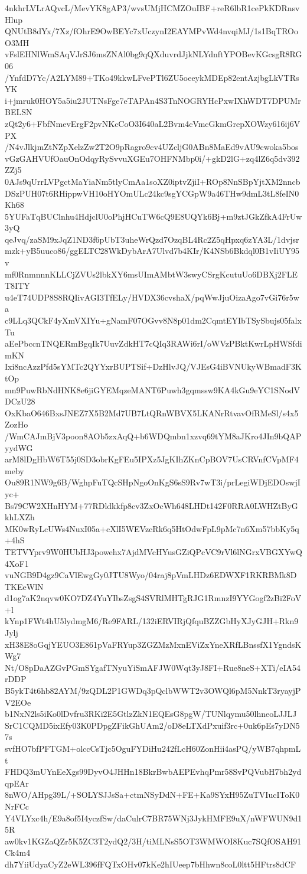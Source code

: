 4nkhrLVLrAQvcL/MevYK8gAP3/wvsUMjHCMZOuIBF+reR6lbR1cePkKDRnsvHlup
QNUtB8dYx/7Xz/fOhrE9OwBEYc7xUczynI2EAYMPvWd4nvqiMJ/1s1BqTROoO3MH
vFslEHNlWmSAqVJrSJ6msZNAl0bg9qQXduvrdJjkNLYdnftYPOBevKGcsgR8RG06
/YnfdD7Yc/A2LYM89+TKo49kkwLFvePTl6ZU5oeeykMDEp82entAzjbgLkVTRsYK
i+jmruk0HOY5a5iu2JUTNsFge7eTAPAn4S3TnNOGRYHcPxwIXhWDT7DPUMrBELSN
zQt2y6+FbfNmevErgF2pvNKcCoO3I640aL2Bvm4cVmcGkmGrepXOWzy616ij6VPX
/N4vJlkjmZtNZpXelzZw2T2O9pRagro9cv4UZcljG0ABn8MaEd9vAU9cwoka5bos
vGzGAHVUfOauOnOdqyRySvvuXGEu7OHFNMbp0i/+gkD2lG+zq4lZ6q5dv392ZZj5
0AJs9qUrrLVPgctMaYiaNm5tlyCmAa1soXZ0iptvZjiI+ROp8NnSBpYjtXM2nncb
DSzPUH07t6RHippwVH10oHYOmULc24kc9sgYCGpW9a46THw9dmL3tL8feIN0Kh68
5YUFaTqBUClnhu4HdjclU0oPhjHCuTW6cQ9E8UQYk6Bj+m9ztJGkZfkA4FrUw3yQ
qeJvq/zaSM9xJqZ1ND3f6pUbT3uheWrQzd7OzqBL4Rc2Z5qHpxq6zYA3L/1dvjsr
mzk+yB5uuco86/ggELTC28WkDybArA7Ulvd7b4KIr/K4NSb6Bkdql0B1vIiUY95v
mf0RnmnnnKLLCjZVUs2lbkXY6msUImAMbtW3swyCSrgKcutuUo6DBXj2FLET8ITY
u4eT74UDP8S8RQIivAGI3TfELy/HVDX36cvshaX/pqWwJjuOizaAgo7vGi76r5wa
c9LLq3QCkF4yXmVXIYu+gNamF07OGvv8N8p01dm2CqmtEYIbTSySbujs05falxTu
aEePbccnTNQERmBgqIk7UuvZdkHT7cQIq3RAWi6rI/oWVzPBktKwrLpHWSfdimKN
Ixi8ncAzzPfd5sYMTc2QYYxrBUPTSif+DzHlvJQ/VJEsG4iBVNUkyWBmadF3KtOp
mn9PuwRbNdHNK8e6jiGYEMqzeMANT6Puwh3gqmssw9KA4kGu9eYC1SNodVDCzU28
OxKbaO646BxsJNEZ7X5B2Md7UB7LtQRnWBVX5LKANrRtvavOfRMeSl/s4x5ZozHo
/WmCAJmBjV3poon8AOb5zxAqQ+b6WDQmbn1xzvq69tYM8aJKro4JIn9bQAPyydWG
arM8lDgHbW6T55j0SD3obrKgFEu5IPXz5JgKIhZKnCpBOV7UsCRVnfCVpMF4meby
Ou89R1NW9g6B/WghpFuTQcSHpNgoOnKgS6sS9Rv7wT3i/prLegiWDjEDOswjIyc+
Bs79CW2XHnHYM+77RDldkkfp8cv3ZxOcWh648LHDt142F0RRA0LWHZtByGkhLXZh
MK0wRyLcUWs4NuxI05a+cXlI5WEVzcRk6q5HtOdwFpL9pMc7n6Xm57bbKy5q+4hS
TETVYprv9W0HUbHJ3powehx7AjdMVcHYusGZiQPcVC9rVl6lNGrxVBGXYwQ4XoF1
vuNGB9D4gz9CaVlEwgGy0JTU8Wyo/04raj8pVmLHDz6EDWXF1RKRBMk8DTKEeWlN
d1og7aK2nqvw0KO7DZ4YuYIbsZsgS4SVRlMHTgRJG1RmnzI9YYGogf2zBi2FoV+l
kYnp1FWt4hU5lydmgM6/Re9FARL/132iERVIRjQfquBZZGbHyXJyGJH+Rkn9Jylj
xH38E8oGqjYEUO3E861pVaFRYup3ZGZMzMxnEViZxYneXRfLBnssfX1YgndsKWg7
Nt/O8pDaAZGvPGmSYgafTNyuYiSmAFJW0Wqt3yJ8FI+Rue8neS+XTi/eIA54rDDP
B5ykT4t6hb82AYM/9zQDL2P1GWDq3pQclbWWT2v3OWQl6pM5NnkT3ryayjPV2EOe
b1NxN2ls5iKo0lDvfru3RKi2E5GtlzZkN1EQEsG8pgW/TUNlqymu50lhneoLJJLJ
SrC1CQMD5ixEfy03K0PDpgZFikGhUAm2/oD8eLTXdPxuif3rc+0uk6pEs7yDN57s
svfHO7bfPFTGM+olccCsTjc5OguFYDiHu242fLcH60ZonHii4asPQ/yWB7qhpmLt
FHDQ3mUYnEeXgs99DyvO4JHHn18BkrBwbAEPEvhqPmr58SvPQVubH7bh2ydqpEAr
8nWO/AHpg39L/+SOLYSJJsSa+ctmNSyDdN+FE+Ka9SYxH95ZuTVIucIToK0NrFCc
Y4VLYxc4h/E9a8of5I4yczfSw/daCulrC7BR75WNj3JykHMFE9uX/nWFWUN9d15R
aw0kv1KGZaQZr5K5ZC3T2ydQ2/3H/tiMLNsS5OT3WMWOI8Kuc7SQfOSAH91Ck4m4
dh7YiiUdyaCyZ2eWL396fFQTxOHv07kKe2hIUeep7bHhwn8coL0ltt5HFtrs8dCF
